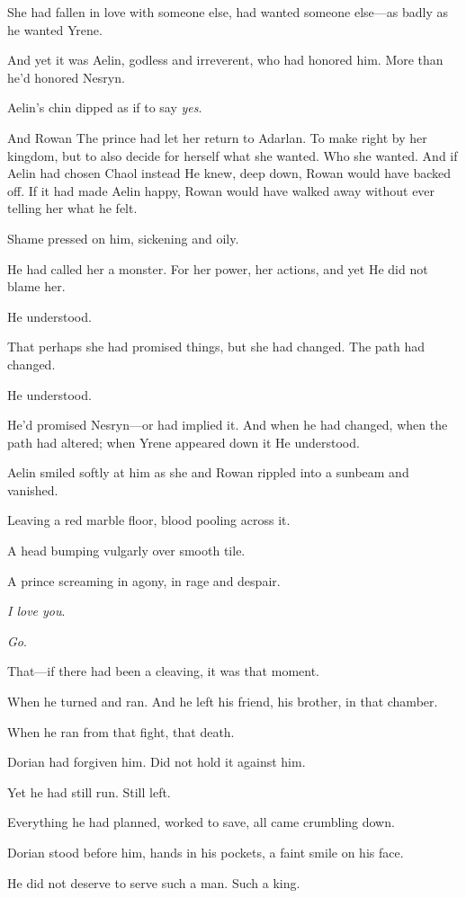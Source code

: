 She had fallen in love with someone else, had wanted someone else---as badly as he wanted Yrene.

And yet it was Aelin, godless and irreverent, who had honored him. More than he'd honored Nesryn.

Aelin's chin dipped as if to say \emph{yes}.

And Rowan  The prince had let her return to Adarlan. To make right by her kingdom, but to also decide for herself what she wanted. Who she wanted. And if Aelin had chosen Chaol instead  He knew, deep down, Rowan would have backed off. If it had made Aelin happy, Rowan would have walked away without ever telling her what he felt.

Shame pressed on him, sickening and oily.

He had called her a monster. For her power, her actions, and yet
 He did not blame her.

He understood.

That perhaps she had promised things, but  she had changed. The path had changed.

He understood.

He'd promised Nesryn---or had implied it. And when he had changed, when the path had altered; when Yrene appeared down it  He understood.

Aelin smiled softly at him as she and Rowan rippled into a sunbeam and vanished.

Leaving a red marble floor, blood pooling across it.

A head bumping vulgarly over smooth tile.

A prince screaming in agony, in rage and despair.

\emph{I love you}.

\emph{Go}.

That---if there had been a cleaving, it was that moment.

When he turned and ran. And he left his friend, his brother, in that chamber.

When he ran from that fight, that death.

Dorian had forgiven him. Did not hold it against him.

Yet he had still run. Still left.

Everything he had planned, worked to save, all came crumbling down.

Dorian stood before him, hands in his pockets, a faint smile on his face.

He did not deserve to serve such a man. Such a king.

